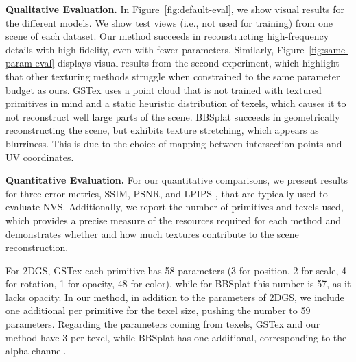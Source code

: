 \textbf{Qualitative Evaluation.}
In Figure~\ref{fig:default-eval},
we show visual results for the different models. We show
test views (i.e., not used for training) from one scene of each dataset.
Our method succeeds in reconstructing high-frequency details with high fidelity,
even with fewer parameters.
Similarly, Figure~\ref{fig:same-param-eval} displays visual results from the second experiment,
which highlight that other texturing methods struggle when constrained to the same parameter budget as ours.
GSTex uses a point cloud that is not trained with textured primitives in mind
and a static heuristic distribution of texels, which causes it to
not reconstruct well large parts of the scene.
BBSplat succeeds in geometrically reconstructing the scene, but exhibits texture stretching, which appears as blurriness.
This is due to the choice of mapping between intersection points and UV coordinates. 

\textbf{Quantitative Evaluation.}
For our quantitative comparisons,
we present results for three error metrics, SSIM, PSNR, and LPIPS \cite{lpips},
that are typically used to evaluate NVS.
Additionally,
we report the number of primitives and
texels used,
which provides a precise measure of the resources required for each method
and demonstrates whether and how much textures contribute to the scene reconstruction.

For 2DGS, GSTex each primitive has 58 parameters (3 for position, 2 for scale, 4 for rotation, 1 for opacity, 48 for color),
while for BBSplat this number is 57,
as it lacks opacity.
In our method,
in addition to the parameters of 2DGS,
we include one additional per primitive for the texel size,
pushing the number to 59 parameters.
Regarding the parameters coming from texels,
GSTex and our method have 3 per texel,
while BBSplat has one additional,
corresponding to the alpha channel.


